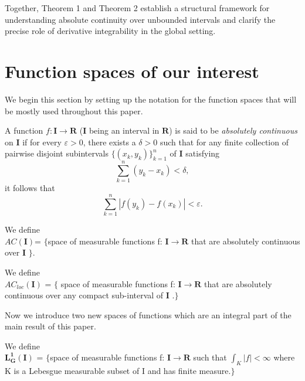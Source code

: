 \documentclass{article}
\numberwithin{equation}{section}
{\theoremstyle{break}\newtheorem{theorem}{Theorem}[subsection]}
{\theoremstyle{break}\theorembodyfont{\rmfamily}\newtheorem{example}[theorem]{Example}}
{\theoremstyle{break}\theorembodyfont{\rmfamily}\newtheorem{definition}[theorem]{Definition}}
{\theoremstyle{break}\theorembodyfont{\rmfamily}\newtheorem{notation}[theorem]{Notation}}
{\theoremstyle{break}\theorembodyfont{\rmfamily}\newtheorem{remark}[theorem]{Remark}}
\begin{document}
Together, Theorem 1 and Theorem 2 establish a structural framework for understanding
absolute continuity over unbounded intervals and clarify the precise role of derivative
integrability in the global setting.

\section{Function spaces of our interest}
We begin this section by setting up the notation for the function spaces that will be mostly used throughout this paper.

\begin{definition}
A function $f : \mathbf{I} \to \mathbf{R}$ ($\mathbf{I}$ being an interval in $\mathbf{R}$) is said to be \emph{absolutely continuous} on $\mathbf{I}$ if for every $\varepsilon > 0$, there exists a $\delta > 0$ such that for any finite collection of pairwise disjoint subintervals $\{(x_k, y_k)\}_{k=1}^n$ of $\mathbf{I}$ satisfying
\[
\sum_{k=1}^n (y_k - x_k) < \delta,
\]
it follows that
\[
\sum_{k=1}^n |f(y_k) - f(x_k)| < \varepsilon.
\]
\end{definition}

\begin{notation}
We define\\
$AC(\mathbf{I})$= $\{$space of measurable functions  f: $\mathbf{I} \to \mathbf{R}$ that are absolutely continuous over $\mathbf{I}$ $\}$.
\end{notation}

\begin{notation}
We define\\
$AC_{loc}(\mathbf{I})$ = $\{$ space of measurable functions f: $\mathbf{I} \to \mathbf{R}$ that are absolutely continuous over any compact sub-interval of $\mathbf{I}$ .$\}$
\end{notation}

Now we introduce two new spaces of functions which are an integral part of the main result of this paper.

\begin{notation}
We define\\
$\mathbf{L^1_G(\mathbf{I})}$ = $\{$space of measurable functions f: $\mathbf{I} \to \mathbf{R}$ such that $ \int_K |f| < \infty$
 where K is a Lebesgue measurable subset of I and has finite measure.$\}$
\end{notation}
\end{document}

